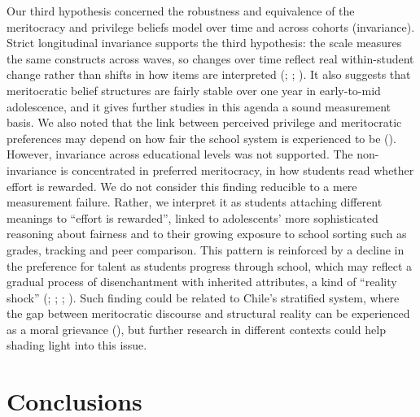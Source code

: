 \documentclass[
  13pt,
]{article}
\begin{document}
Our third hypothesis concerned the robustness and equivalence of the
meritocracy and privilege beliefs model over time and across cohorts
(invariance). Strict longitudinal invariance supports the third
hypothesis: the scale measures the same constructs across waves, so
changes over time reflect real within-student change rather than shifts
in how items are interpreted (; ; ). It also suggests that meritocratic belief
structures are fairly stable over one year in early-to-mid adolescence,
and it gives further studies in this agenda a sound measurement basis.
We also noted that the link between perceived privilege and meritocratic
preferences may depend on how fair the school system is experienced to
be (). However,
invariance across educational levels was not supported. The
non-invariance is concentrated in preferred meritocracy, in how students
read whether effort is rewarded. We do not consider this finding
reducible to a mere measurement failure. Rather, we interpret it as
students attaching different meanings to ``effort is rewarded'', linked
to adolescents' more sophisticated reasoning about fairness and to their
growing exposure to school sorting such as grades, tracking and peer
comparison. This pattern is reinforced by a decline in the preference
for talent as students progress through school, which may reflect a
gradual process of disenchantment with inherited attributes, a kind of
``reality shock'' (;
;
;
). Such finding
could be related to Chile's stratified system, where the gap between
meritocratic discourse and structural reality can be experienced as a
moral grievance (), but further research in different contexts could
help shading light into this issue.

\section{Conclusions}\label{conclusions}
\end{document}
